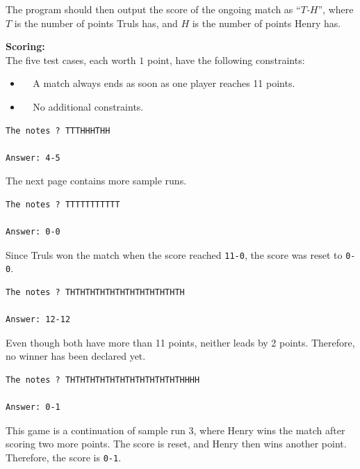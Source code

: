The program should then output the score of the ongoing match as ``\textit{$T$-$H$}'', where $T$ is
the number of points Truls has, and $H$ is the number of points Henry has.

\textbf{Scoring:}\\  
The five test cases, each worth $1$ point, have the following constraints:  
\begin{itemize}
  \item[(1-2)] $\;\;\;\;$A match always ends as soon as one player reaches 11 points.  
  \item[(3-5)] $\;\;\;\;$No additional constraints.  
\end{itemize}

\vspace{1cm}

\begin{verbatim}
The notes ? TTTHHHTHH

Answer: 4-5
\end{verbatim}

The next page contains more sample runs.


\newpage

\begin{verbatim}
The notes ? TTTTTTTTTTT

Answer: 0-0
\end{verbatim}

 Since Truls won the match when the score reached \texttt{11-0}, the score was reset to \texttt{0-0}.

\vspace{0.5cm}

\begin{verbatim}
The notes ? THTHTHTHTHTHTHTHTHTHTHTH

Answer: 12-12
\end{verbatim}
 Even though both have more than 11 points, neither leads by 2 points. Therefore, no winner has been declared yet.


\begin{verbatim}
The notes ? THTHTHTHTHTHTHTHTHTHTHTHHHH

Answer: 0-1
\end{verbatim}
 This game is a continuation of sample run 3, where Henry wins the match after scoring two more points.  
The score is reset, and Henry then wins another point. Therefore, the score is \texttt{0-1}.


\newpage
{}

